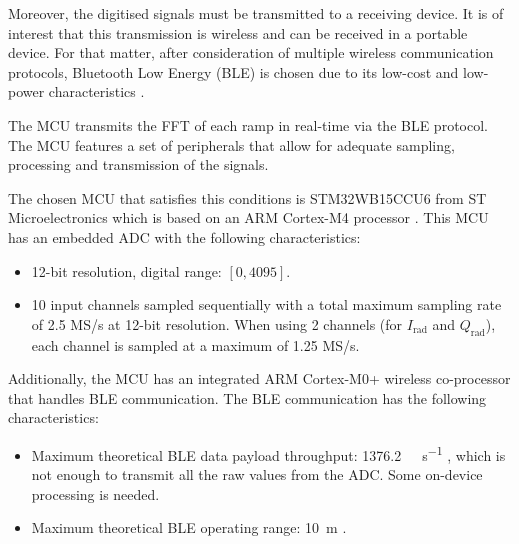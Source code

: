 	Moreover, the digitised signals must be transmitted to a receiving device. It is of interest that this transmission is wireless and can be received in a portable device. For that matter, after consideration of multiple wireless communication protocols, Bluetooth Low Energy (BLE) is chosen due to its low-cost and low-power characteristics \cite{Gomez2012}.
	
	The MCU transmits the FFT of each ramp in real-time via the BLE protocol. The MCU features a set of peripherals that allow for adequate sampling, processing and transmission of the signals. 
	
	The chosen MCU that satisfies this conditions is STM32WB15CCU6 from ST Microelectronics which is based on an ARM Cortex-M4 processor \cite{STMicroelectronics2022}. This MCU has an embedded ADC with the following characteristics:
	\begin{itemize}
		\item 12-bit resolution, digital range: $[0, 4095]$.
		\item 10 input channels sampled sequentially with a total maximum sampling rate of 2.5 MS/s at 12-bit resolution. When using 2 channels (for $I_\mathrm{rad}$ and $Q_\mathrm{rad}$), each channel is sampled at a maximum of 1.25 MS/s.
	\end{itemize}

	Additionally, the MCU has an integrated ARM Cortex-M0+ wireless co-processor that handles BLE communication. The BLE communication has the following characteristics:
	\begin{itemize}
		\item Maximum theoretical BLE data payload throughput: \SI{1376.2}{\kilo\bit\per\second} \cite{NordicSemiconductor2019,Bluetooth52},  which is not enough to transmit all the raw values from the ADC. Some on-device processing is needed.
		\item Maximum theoretical BLE operating range: \SI{10}{\meter} \cite{Bluetooth52}.
	\end{itemize}